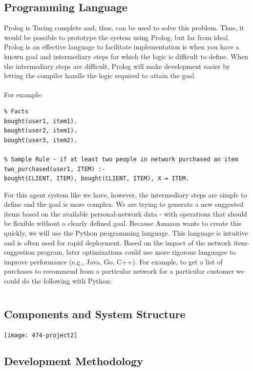 \documentclass[12pt,a4paper]{article}
\begin{document}
	\subsection*{Programming Language}
		Prolog is Turing complete and, thus, can be used to solve this problem. Thus, it would be possible to prototype the system using Prolog, but far from ideal. Prolog is an effective language to facilitate implementation is when you have a known goal and intermediary steps for which the logic is difficult to define. When the intermediary steps are difficult, Prolog will make development easier by letting the compiler handle the logic required to attain the goal. 
		\\\\
		For example:
\begin{verbatim}
% Facts
bought(user1, item1).
bought(user2, item1).
bought(user3, item2).

% Sample Rule - if at least two people in network purchased an item
two_purchased(user1, ITEM) :- 
bought(CLIENT, ITEM), bought(CLIENT, ITEM), X = ITEM.
\end{verbatim}
		For this agent system like we have, however, the intermediary steps are simple to define and the goal is more complex. We are trying to generate a new suggested items based on the available personal-network data - with operations that should be flexible without a clearly defined goal. Because Amazon wants to create this quickly, we will use the Python programming language. This language is intuitive and is often used for rapid deployment. Based on the impact of the network item-suggestion program, later optimizations could use more rigorous languages to improve performance (e.g., Java, Go, C++).
		\clearpage
		For example, to get a list of purchases to recommend from a particular network for a particular customer we could do the following with Python:
		\inputminted{python}{sample-functions.py}
		
		\subsection*{Components and System Structure}
		\begin{center}
			\texttt{[image: 474-project2]}
		\end{center}
		
		
		\subsection*{Development Methodology}
		
\end{document}

